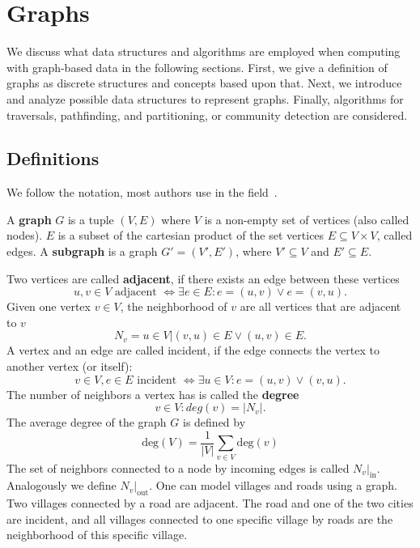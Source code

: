 \chapter{Graphs}\label{\positionnumber}
    We discuss what data structures and algorithms are employed when computing with graph-based data in the following sections.
    First, we give a definition of graphs as discrete structures and concepts based upon that. 
    Next, we introduce and analyze possible data structures to represent graphs. 
    Finally, algorithms for traversals, pathfinding, and partitioning, or community detection are considered.
    
    \section{Definitions}\label{\positionnumber}
        We follow the notation, most authors use in the field~\autocite{steger2007diskrete, Gross1998GraphTA, aho1974design, cormen2009introduction, Goodrich2014AlgorithmDA}.
    
        A \textbf{graph} $G$ is a tuple $(V, E)$ where $V$ is a non-empty set of vertices (also called nodes). 
        $E$ is a subset of the cartesian product of the set vertices $E \subseteq V \times V$, called edges.
        A \textbf{subgraph} is a graph $G' = (V', E')$, where $V' \subseteq V$ and $E' \subseteq E$. 
        
        Two vertices are called \textbf{adjacent}, if there exists an edge between these vertices
        \[ u,v \in V \text{ adjacent } \Leftrightarrow \exists e \in E: e = (u, v) \vee e= (v, u).\]
        Given one vertex $v \in V$, the neighborhood of $v$ are all vertices that are adjacent to $v$
        \[N_v = {u \in V | (v, u) \in E \vee (u, v) \in E}.\] 
        A vertex and an edge are called incident, if the edge connects the vertex to another vertex (or itself): 
        \[v \in V, e\in E \text{ incident } \Leftrightarrow \exists u \in V: e = (u,v) \vee (v,u).\]
        The number of neighbors a vertex has is called the \textbf{degree}
        \[v \in V: deg(v) = |N_v|.\]
        The average degree of the graph $G$ is defined by
        \[ \text{deg}(V) = \frac{1}{|V|} \sum_{v \in V}\text{deg}(v)\]
        The set of neighbors connected to a node by incoming edges is called $N_v |_\text{in}$. Analogously we define $N_v |_\text{out}$.             
        One can model villages and roads using a graph. 
        Two villages connected by a road are adjacent. 
        The road and one of the two cities are incident, and all villages connected to one specific village by roads are the neighborhood of this specific village. 
        
